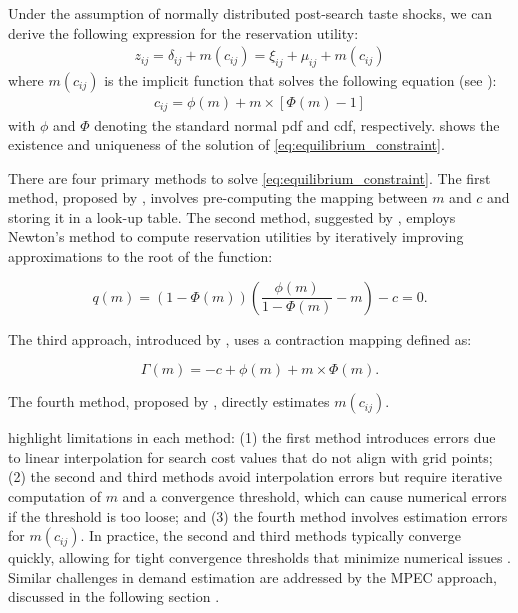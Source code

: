 \documentclass[12pt]{article}
\begin{document}
Under the assumption of normally distributed post-search taste shocks, we can derive the following
expression for the reservation utility:
\begin{align}
    z_{i j}=\delta_{i j}+m\left(c_{i j}\right)=\xi_{i j}+\mu_{i j}+m\left(c_{i j}\right) 
\end{align}
where \(m\left(c_{i j} \right)\) is the implicit function that solves the following equation (see \cite{kim2010online}):
\begin{align}
    c_{i j}=\phi(m)+m \times[\Phi(m)-1] \label{eq:equilibrium_constraint}
\end{align}
with \(\phi\) and \(\Phi\) denoting the standard normal pdf and cdf, respectively. \cite{weitzman1979optimal} shows the existence and uniqueness of the solution of \eqref{eq:equilibrium_constraint}.


There are four primary methods to solve \eqref{eq:equilibrium_constraint}. The first method, proposed by \cite{kim2010online}, involves pre-computing the mapping between \( m \) and \( c \) and storing it in a look-up table. The second method, suggested by \cite{jiang2021consumer}, employs Newton's method to compute reservation utilities by iteratively improving approximations to the root of the function:

\[
    q(m) = (1-\Phi(m))\left(\frac{\phi(m)}{1-\Phi(m)} - m\right) - c = 0.
\]

The third approach, introduced by \cite{elberg2019dynamic}, uses a contraction mapping defined as:

\[
    \Gamma(m) = -c + \phi(m) + m \times \Phi(m).
\]

The fourth method, proposed by \cite{morozov2023measuring}, directly estimates \( m(c_{ij}) \).

\cite{ursu2023sequential} highlight limitations in each method: (1) the first method introduces errors due to linear interpolation for search cost values that do not align with grid points; (2) the second and third methods avoid interpolation errors but require iterative computation of \( m \) and a convergence threshold, which can cause numerical errors if the threshold is too loose; and (3) the fourth method involves estimation errors for \( m(c_{ij}) \). In practice, the second and third methods typically converge quickly, allowing for tight convergence thresholds that minimize numerical issues \citep{ursu2023sequential}. Similar challenges in demand estimation are addressed by the MPEC approach, discussed in the following section \citep{dube2012improving}.
\end{document}
